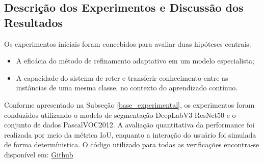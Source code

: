 

\subsection{Descrição dos Experimentos e Discussão dos Resultados}
\label{subsec:experiments}

Os experimentos iniciais foram concebidos para avaliar duas hipóteses centrais: %

\begin{itemize}
\item A eficácia do método de refinamento adaptativo em um modelo especialista;
\item A capacidade do sistema de reter e transferir conhecimento entre as instâncias de uma mesma classe, no contexto do aprendizado contínuo.
\end{itemize}

Conforme apresentado na Subseção \ref{base_experimental}, os experimentos foram conduzidos utilizando o modelo de segmentação DeepLabV3-ResNet50 e o conjunto de dados \ac{PascalVOC2012}. A avaliação quantitativa da performance foi realizada por meio da métrica \ac{IoU}, enquanto a interação do usuário foi simulada de forma determínistica. O código utilizado para todas as verificações encontra-se disponível em: \href{https://github.com/DanielGaletti/CLIS_Updated}{Github}
 

